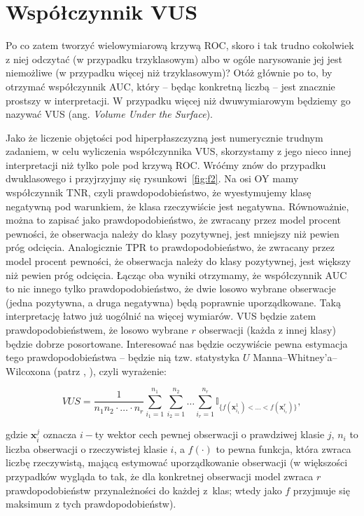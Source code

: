 \documentclass{mini}
\begin{document}
\section{Współczynnik VUS}

Po co zatem tworzyć wielowymiarową krzywą ROC, skoro i tak trudno cokolwiek z niej odczytać (w przypadku trzyklasowym) albo w ogóle narysowanie jej jest niemożliwe (w przypadku więcej niż trzyklasowym)? Otóż głównie po to, by otrzymać współczynnik AUC, który -- będąc konkretną liczbą -- jest znacznie prostszy w interpretacji. W przypadku więcej niż dwuwymiarowym będziemy go nazywać VUS (ang. \textit{Volume Under the Surface}). 

Jako że liczenie objętości pod hiperpłaszczyzną jest numerycznie trudnym zadaniem, w celu wyliczenia współczynnika VUS, skorzystamy z jego nieco innej interpretacji niż tylko pole pod krzywą ROC. Wróćmy znów do przypadku dwuklasowego i przyjrzyjmy się rysunkowi~\ref{fig:f2}. Na osi OY mamy współczynnik TNR, czyli prawdopodobieństwo, że wyestymujemy klasę negatywną pod warunkiem, że klasa rzeczywiście jest negatywna. Równoważnie, można to zapisać jako prawdopodobieństwo, że zwracany przez model procent pewności, że obserwacja należy do klasy pozytywnej, jest mniejszy niż pewien próg odcięcia. Analogicznie TPR to prawdopodobieństwo, że zwracany przez model procent pewności, że obserwacja należy do klasy pozytywnej, jest większy niż pewien próg odcięcia. Łącząc oba wyniki otrzymamy, że współczynnik AUC to nic innego tylko prawdopodobieństwo, że dwie losowo wybrane obserwacje (jedna pozytywna, a druga negatywna) będą poprawnie uporządkowane. Taką interpretację łatwo już uogólnić na więcej wymiarów. VUS będzie zatem prawdopodobieństwem, że losowo wybrane $r$ obserwacji (każda z innej klasy) będzie dobrze posortowane. Interesować nas będzie oczywiście pewna estymacja tego prawdopodobieństwa -- będzie nią tzw. statystyka $U$  Manna–Whitney'a–Wilcoxona (patrz \cite{roc2}, \cite{roc1}), czyli wyrażenie:

\begin{equation}\label{dop3}
VUS = \dfrac{1}{n_1n_2\cdot\ldots\cdot n_r}\sum_{i_1=1}^{n_1}\sum_{i_2=1}^{n_2}\ldots\sum_{i_r=1}^{n_r}\mathbb{I}_{\lbrace f(\mathbf{x}_{i_1}^1)<\ldots<f(\mathbf{x}_{i_r}^r)\rbrace},
\end{equation}

gdzie $\textbf{x}_i^j$ oznacza $i-$ty wektor cech pewnej obserwacji o prawdziwej klasie $j$, $n_i$ to liczba obserwacji o rzeczywistej klasie $i$, a $f(\cdot)$ to pewna funkcja, która zwraca liczbę rzeczywistą, mającą estymować uporządkowanie obserwacji (w większości przypadków wygląda to tak, że dla konkretnej obserwacji model zwraca $r$ prawdopodobieństw przynależności do każdej z~klas; wtedy jako $f$ przyjmuje się maksimum z tych prawdopodobieństw).
\end{document}
